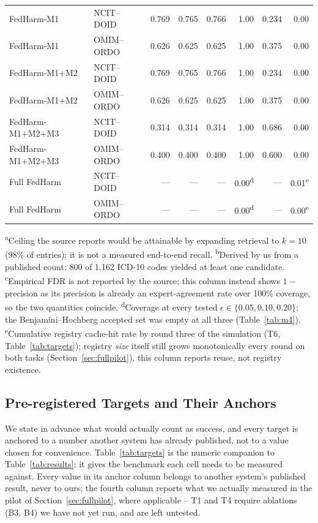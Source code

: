 \documentclass[conference]{IEEEtran}
\begin{document}
\begin{table}[t]
\begin{tabular}{@{}llrrrrrr@{}}
FedHarm-M1               & NCIT--DOID      & 0.769 & 0.765 & 0.766 & 1.00 & 0.234 & 0.00 \\
FedHarm-M1               & OMIM--ORDO      & 0.626 & 0.625 & 0.625 & 1.00 & 0.375 & 0.00 \\
FedHarm-M1+M2            & NCIT--DOID      & 0.769 & 0.765 & 0.766 & 1.00 & 0.234 & 0.00 \\
FedHarm-M1+M2            & OMIM--ORDO      & 0.626 & 0.625 & 0.625 & 1.00 & 0.375 & 0.00 \\
FedHarm-M1+M2+M3         & NCIT--DOID      & 0.314 & 0.314 & 0.314 & 1.00 & 0.686 & 0.00 \\
FedHarm-M1+M2+M3         & OMIM--ORDO      & 0.400 & 0.400 & 0.400 & 1.00 & 0.600 & 0.00 \\
Full FedHarm             & NCIT--DOID      & --- & --- & --- & 0.00\textsuperscript{d} & --- & 0.01\textsuperscript{e} \\
Full FedHarm             & OMIM--ORDO      & --- & --- & --- & 0.00\textsuperscript{d} & --- & 0.00\textsuperscript{e} \\
\bottomrule
\end{tabular}

\smallskip
{\footnotesize \textsuperscript{a}Ceiling the source reports would be attainable by expanding retrieval to $k{=}10$ (98\% of entries); it is not a measured end-to-end recall. \textsuperscript{b}Derived by us from a published count: 800 of 1{,}162 ICD-10 codes yielded at least one candidate. \textsuperscript{c}Empirical FDR is not reported by the source; this column instead shows $1-$precision as its precision is already an expert-agreement rate over 100\% coverage, so the two quantities coincide. \textsuperscript{d}Coverage at every tested $\epsilon \in \{0.05, 0.10, 0.20\}$; the Benjamini--Hochberg accepted set was empty at all three (Table~\ref{tab:m4}). \textsuperscript{e}Cumulative registry cache-hit rate by round three of the simulation (T6, Table~\ref{tab:targets}); registry \emph{size} itself still grows monotonically every round on both tasks (Section~\ref{sec:fullpilot}), this column reports reuse, not registry existence.}
\end{table}

\subsection{Pre-registered Targets and Their Anchors}
\label{sec:targets}

We state in advance what would actually count as success, and every target is anchored to a number another system has already published, not to a value chosen for convenience. Table~\ref{tab:targets} is the numeric companion to Table~\ref{tab:results}: it gives the benchmark each cell needs to be measured against. Every value in its anchor column belongs to another system's published result, never to ours; the fourth column reports what we actually measured in the pilot of Section~\ref{sec:fullpilot}, where applicable -- T1 and T4 require ablations (B3, B4) we have not yet run, and are left untested.
\end{document}
